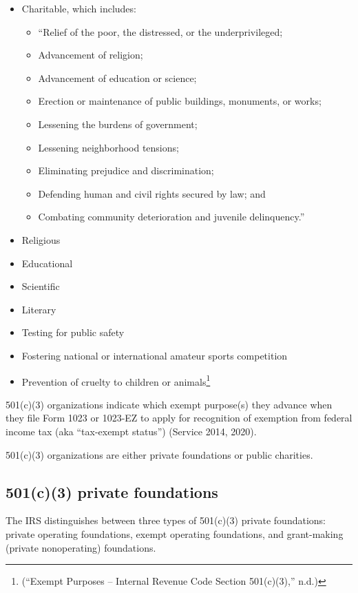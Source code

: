 \documentclass[
  letterpaper,
  DIV=11,
  numbers=noendperiod,
  oneside]{scrreprt}
\begin{document}
\begin{itemize}
\item
  Charitable, which includes:

  \begin{itemize}
  \item
    ``Relief of the poor, the distressed, or the underprivileged;
  \item
    Advancement of religion;
  \item
    Advancement of education or science;
  \item
    Erection or maintenance of public buildings, monuments, or works;
  \item
    Lessening the burdens of government;
  \item
    Lessening neighborhood tensions;
  \item
    Eliminating prejudice and discrimination;
  \item
    Defending human and civil rights secured by law; and
  \item
    Combating community deterioration and juvenile delinquency.''
  \end{itemize}
\item
  Religious
\item
  Educational
\item
  Scientific
\item
  Literary
\item
  Testing for public safety
\item
  Fostering national or international amateur sports competition
\item
  Prevention of cruelty to children or animals\footnote{({``Exempt
    Purposes -- Internal Revenue Code Section 501(c)(3),''} n.d.)}
\end{itemize}

501(c)(3) organizations indicate which exempt purpose(s) they advance
when they file Form 1023 or 1023-EZ to apply for recognition of
exemption from federal income tax (aka ``tax-exempt status'') (Service
2014, 2020).

501(c)(3) organizations are either private foundations or public
charities.

\hypertarget{c3-private-foundations}{%
\subsection{501(c)(3) private
foundations}\label{c3-private-foundations}}

The IRS distinguishes between three types of 501(c)(3) private
foundations: private operating foundations, exempt operating
foundations, and grant-making (private nonoperating) foundations.
\end{document}
